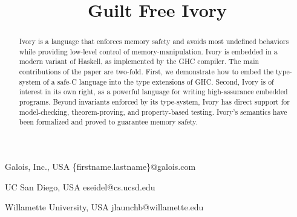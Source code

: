 \documentclass{sigplanconf}
\begin{document}
\toappear{}

\setlength{\pdfpageheight}{\paperheight}
\setlength{\pdfpagewidth}{\paperwidth}

\copyrightdata{}
\doi{}



\permissiontopublish             %


\title{Guilt Free Ivory}

           {Galois, Inc., USA}
           {\{firstname.lastname\}@galois.com}

           {UC San Diego, USA}
           {eseidel@cs.ucsd.edu}

           {Willamette University, USA}
           {jlaunchb@willamette.edu}

\maketitle

\begin{abstract}
Ivory is a language that enforces memory safety and avoids most undefined
behaviors while providing low-level control of memory-manipulation. Ivory is
embedded in a modern variant of Haskell, as implemented by the GHC compiler. The
main contributions of the paper are two-fold. First, we demonstrate how to
embed the type-system of a safe-C language into the type
extensions of GHC. Second, Ivory is of interest in its own right, as a powerful
language for writing high-assurance embedded programs. Beyond invariants
enforced by its type-system, Ivory has direct support for model-checking,
theorem-proving, and property-based testing. Ivory's semantics have been
formalized and proved to guarantee memory safety.
\end{abstract}
\end{document}
